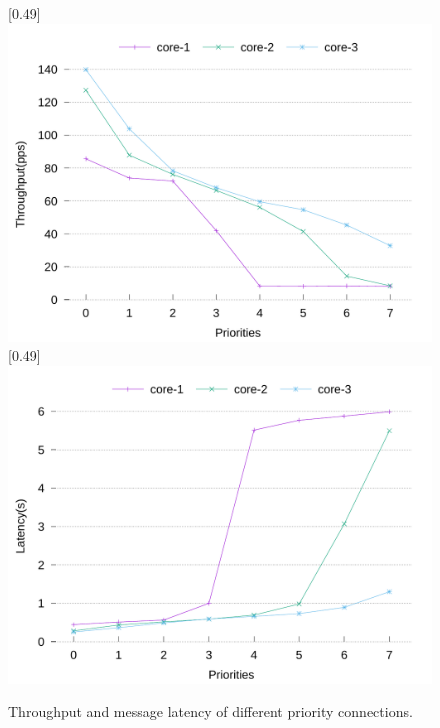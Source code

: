 \documentclass[sigconf,review,anonymous]{acmart}
\providecommand{\DIFaddbeginFL}{} %
\providecommand{\DIFaddendFL}{} %
\providecommand{\DIFdelbeginFL}{} %
\providecommand{\DIFdelendFL}{} %
\begin{document}
\begin{figure}[ht]
  \DIFaddbeginFL {}
	\DIFaddendFL \centering
	[0.49\linewidth]
	{
		\includegraphics[width=\linewidth]{assets/prio-throughput.pdf}
	}
	[0.49\linewidth]
	{
		\includegraphics[width=\linewidth]{assets/prio-latency.pdf}
	}
	\caption{Throughput and message latency of different priority connections.}
	\label{fig:prio-throughput-latency}
	\DIFdelbeginFL %
\DIFdelendFL \DIFaddbeginFL \vspace{-1.0em}
\DIFaddendFL \end{figure}
\end{document}
